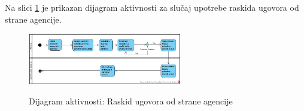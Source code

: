\documentclass[20pt]{article}
\begin{document}
\newpage
{}
\setlength{\parindent}{1cm}
\fontsize{13}{18} \selectfont 
Na slici \ref{fig:dijagramAktivnostiRaskidUgovoraOdAgencije} je prikazan dijagram aktivnosti za slu\v{c}aj upotrebe raskida ugovora od strane agencije.

\begin{figure}[h]
		\centering
		\includegraphics[width=0.6\textwidth,height=0.23\textheight]{Pictures/raskidUgovoraOdStraneAgencije}\\
		\caption{Dijagram aktivnosti: Raskid ugovora od strane agencije}
		\label{fig:dijagramAktivnostiRaskidUgovoraOdAgencije}
	\end{figure}
\setlength{\parindent}{1cm}
\fontsize{13}{18} \selectfont 
\end{document}
